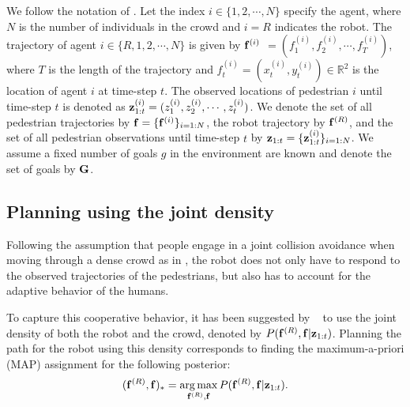 We follow the notation of \cite{trautman10}.
Let the index $i \in \{1,2,\cdots,N\}$ specify the agent, where $N$ is the number of individuals in the crowd and $i=R$ indicates the robot. 
The trajectory of agent $i \in \{R,1,2,\cdots,N\}$ is given by $\mathbf{f}^{(i)}$ $= (f_1^{(i)}, f_2^{(i)}, \cdots, f_T^{(i)})$, where $T$ is the length of the trajectory and $f_t^{(i)} = (x_t^{(i)}, y_t^{(i)}) \in \mathbb{R}^2$ is the location of agent $i$ at time-step $t$. The observed locations of pedestrian $i$ until time-step $t$ is denoted as $\mathbf{z}^{(i)}_{1:t} = (z_1^{(i)}, z_2^{(i)}, \cdots, z_t^{(i)})$.  We denote the set of all pedestrian trajectories by $\mathbf{f}=\{\mathbf{f}^{(i)}\}_{i=1:N}$, the robot trajectory by $\mathbf{f}^{(R)}$, and the set of all pedestrian observations until time-step $t$ by $\mathbf{z}_{1:t} = \{\mathbf{z}^{(i)}_{1:t}\}_{i=1:N}$. We assume a fixed number of goals $g$ in the environment are known and denote the set of goals by $\mathbf{G}$. %

\subsection{Planning using the joint density}
\label{sec:oigp-planning}
%
%
%
%
Following the assumption that people engage in a joint collision
avoidance when moving through a dense crowd
 as in \cite{helbing95,trautman10},
the robot does not only have to respond to the observed trajectories
of the pedestrians, but also has to account for the adaptive behavior
of the humans.

To capture this cooperative behavior, it has been suggested by
~\cite{trautman10} to use the joint density of both the robot and the
crowd, denoted by $P(\mathbf{f}^{(R)}, \mathbf{f}|\mathbf{z}_{1:t})$.
%
%
%
%
%
Planning the path for the robot using this density corresponds to
finding the maximum-a-priori (MAP) assignment for the following
posterior:
\begin{equation}
  \label{eq:oigp-8}
  (\mathbf{f}^{(R)}, \mathbf{f})_* = \operatorname*{arg\,max}_{\mathbf{f}^{(R)}, \mathbf{f}} P(\mathbf{f}^{(R)}, \mathbf{f}|\mathbf{z}_{1:t}).
\end{equation}

%
%
%
%
%
%
%

